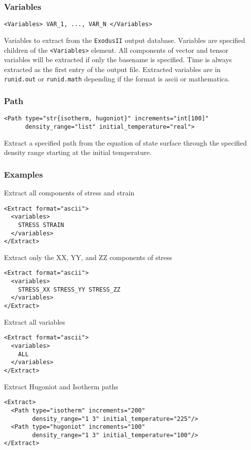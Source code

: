 \documentclass[11pt]{report}
\newcommand{\exodusii}{{\sc\texttt{ExodusII}}}
\renewcommand{\tag}[1]{\texttt{<#1>}}
\newcommand{\supporting}[1]{\texttt{Supporting Drivers: #1}}
\begin{document}
\subsubsection{Variables}
\begin{verbatim}
<Variables> VAR_1, ..., VAR_N </Variables>
\end{verbatim}
%
Variables to extract from the \exodusii{} output database. Variables are specified
children of the \tag{Variables} element. All components of vector and tensor
variables will be extracted if only the basename is specified. Time is always
extracted as the first entry of the output file.  Extracted variables are in
\texttt{runid.out} or \texttt{runid.math} depending if the format is ascii or
mathematica.

\subsubsection{Path}
\begin{verbatim}
<Path type="str{isotherm, hugoniot}" increments="int[100]"
      density_range="list" initial_temperature="real">
\end{verbatim}
%
Extract a specified path from the equation of state surface through the
specified density range starting at the initial temperature.

\subsubsection{Examples}
Extract all components of stress and strain
%
\begin{verbatim}
<Extract format="ascii">
  <variables>
    STRESS STRAIN
  </variables>
</Extract>
\end{verbatim}

Extract only the XX, YY, and ZZ components of stress
%
\begin{verbatim}
<Extract format="ascii">
  <variables>
    STRESS_XX STRESS_YY STRESS_ZZ
  </variables>
</Extract>
\end{verbatim}

Extract all variables
\begin{verbatim}
<Extract format="ascii">
  <variables>
    ALL
  </variables>
</Extract>
\end{verbatim}

Extract Hugoniot and Isotherm paths
\begin{verbatim}
<Extract>
  <Path type="isotherm" increments="200"
        density_range="1 3" initial_temperature="225"/>
  <Path type="hugoniot" increments="100"
        density_range="1 3" initial_temperature="100"/>
</Extract>
\end{verbatim}
\end{document}
